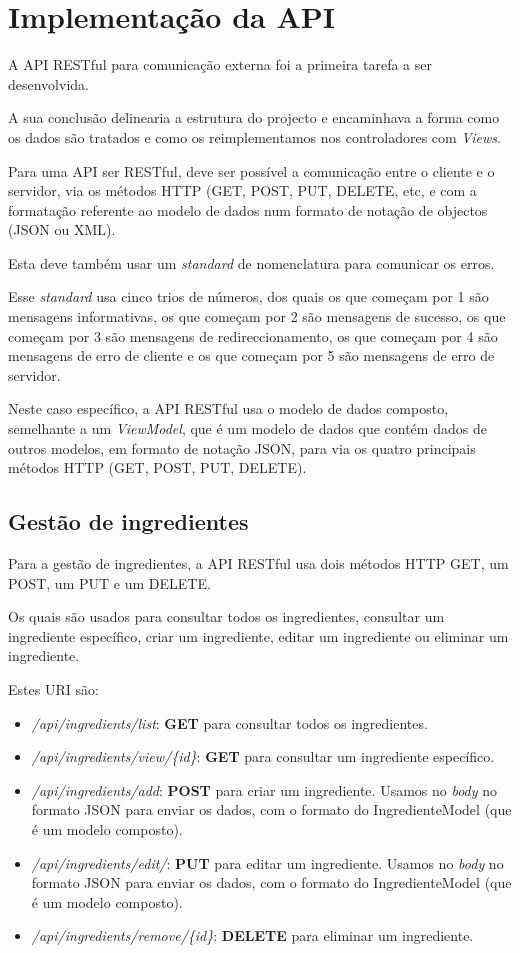 \chapter{Implementação da API}

A API RESTful para comunicação externa foi a primeira tarefa a ser desenvolvida.

A sua conclusão delinearia a estrutura do projecto e encaminhava a forma como os dados são tratados e como os reimplementamos nos controladores com \textit{Views}.

Para uma API ser RESTful, deve ser possível a comunicação entre o cliente e o servidor, via os métodos HTTP (GET, POST, PUT, DELETE, etc, e com a formatação referente ao modelo de dados num formato de notação de objectos (JSON ou XML).

Esta deve também usar um \textit{standard} de nomenclatura para comunicar os erros.

Esse \textit{standard} usa cinco trios de números, dos quais os que começam por 1 são mensagens informativas, os que começam por 2 são mensagens de sucesso, os que começam por 3 são mensagens de redireccionamento, os que começam por 4 são mensagens de erro de cliente e os que começam por 5 são mensagens de erro de servidor.

Neste caso específico, a API RESTful usa o modelo de dados composto, semelhante a um \textit{ViewModel}, que é um modelo de dados que contém dados de outros modelos, em formato de notação JSON, para via os quatro principais métodos HTTP (GET, POST, PUT, DELETE).

\section{Gestão de ingredientes}

Para a gestão de ingredientes, a API RESTful usa dois métodos HTTP GET, um POST, um PUT e um DELETE.

Os quais são usados para consultar todos os ingredientes, consultar um ingrediente específico, criar um ingrediente, editar um ingrediente ou eliminar um ingrediente.

Estes URI são:

\begin{itemize}
  \item \textit{/api/ingredients/list}: \textbf{GET} para consultar todos os ingredientes.
  \item \textit{/api/ingredients/view/\{id\}}: \textbf{GET} para consultar um ingrediente específico.
  \item \textit{/api/ingredients/add}: \textbf{POST} para criar um ingrediente. Usamos no \textit{body} no formato JSON para enviar os dados, com o formato do IngredienteModel (que é um modelo composto).
  \item \textit{/api/ingredients/edit/}: \textbf{PUT} para editar um ingrediente. Usamos no \textit{body} no formato JSON para enviar os dados, com o formato do IngredienteModel (que é um modelo composto).
  \item \textit{/api/ingredients/remove/\{id\}}: \textbf{DELETE} para eliminar um ingrediente.
\end{itemize}

